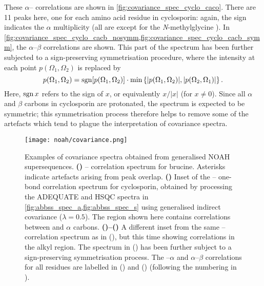 These $\alpha$-- correlations are shown in \cref{fig:covariance_spec_cyclo_caco}.
There are 11 peaks here, one for each amino acid residue in cyclosporin: again, the sign indicates the $\alpha$ multiplicity (all are  except for the \textit{N}-methylglycine ).
In \cref{fig:covariance_spec_cyclo_cacb_nosymm,fig:covariance_spec_cyclo_cacb_symm}, the $\alpha$--$\beta$ correlations are shown.
This part of the spectrum has been further subjected to a sign-preserving symmetrisation procedure, where the intensity at each point $p(\Omega_1, \Omega_2)$ is replaced by
\begin{equation}
    \label{eq:covariance_symmetrisation}
    p(\Omega_1, \Omega_2) = \operatorname*{sgn}[p(\Omega_1, \Omega_2)] \cdot \min\left\{|p(\Omega_1, \Omega_2)|, |p(\Omega_2, \Omega_1)|\right\}.
\end{equation}
Here, $\operatorname*{sgn}{x}$ refers to the sign of $x$, or equivalently $x / |x|$ (for $x \neq 0$).
Since all $\alpha$ and $\beta$ carbons in cyclosporin are protonated, the spectrum is expected to be symmetric; this symmetrisation process therefore helps to remove some of the artefacts which tend to plague the interpretation of covariance spectra.

\begin{figure}[!ht]
    \centering
    \texttt{[image: noah/covariance.png]}%
    {\label{fig:covariance_spec_bruc_cn}}%
    {\label{fig:covariance_spec_cyclo_caco}}%
    {\label{fig:covariance_spec_cyclo_cacb_nosymm}}%
    {\label{fig:covariance_spec_cyclo_cacb_symm}}%
    \caption[Examples of covariance spectra obtained from generalised NOAH supersequences]{
        Examples of covariance spectra obtained from generalised NOAH supersequences.
        \textbf{()} \carbon{}--\nitrogen{} correlation spectrum for brucine.
        Asterisks indicate artefacts arising from peak overlap.
        \textbf{()} Inset of the \carbon{}--\carbon{} one-bond correlation spectrum for cyclosporin, obtained by processing the ADEQUATE and \carbon{} HSQC spectra in \cref{fig:abbss_spec_a,fig:abbss_spec_s} using generalised indirect covariance ($\lambda = 0.5$).
        The region shown here contains correlations between  and $\alpha$ carbons.
        \textbf{()--()} A different inset from the same \carbon{}--\carbon{} correlation spectrum as in (), but this time showing correlations in the alkyl region.
        The spectrum in () has been further subject to a sign-preserving symmetrisation process.
        The --$\alpha$ and $\alpha$--$\beta$ correlations for all residues are labelled in () and () (following the numbering in ).
    }
    \label{fig:covariance_spec}
\end{figure}
